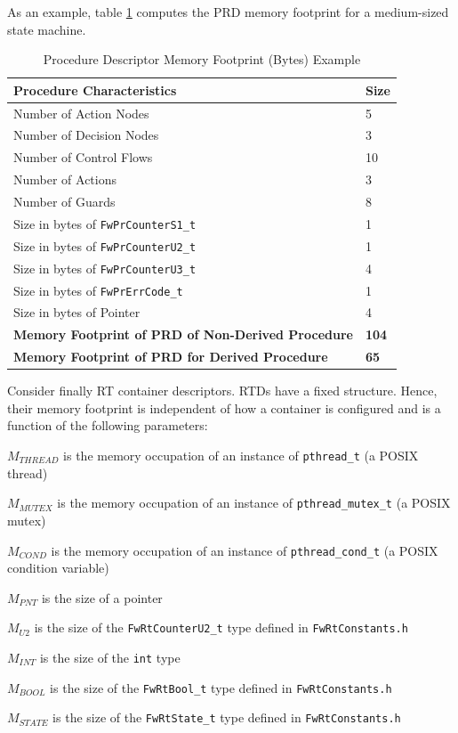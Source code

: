 \documentclass[a4paper,10pt]{article}
\newenvironment{fw_itemize}						%
{\begin{itemize}
  \setlength{\itemsep}{1mm}
  \setlength{\parskip}{0pt}
  \setlength{\parsep}{0pt}}
{\end{itemize}}
\begin{document}
As an example, table \ref{tab:prdMemFootprintExample} computes the PRD memory footprint for a 
medium-sized state machine. 

\begin{longtable}{|l|l|}
\caption{Procedure Descriptor Memory Footprint (Bytes) Example} \label{tab:prdMemFootprintExample}\\
\hline
\rowcolor{gray}
\textbf{Procedure Characteristics} & \textbf{Size} \\
\hline\hline
Number of Action Nodes & 5 \\
\hline
Number of Decision Nodes & 3 \\
\hline
Number of Control Flows & 10 \\
\hline
Number of Actions & 3 \\
\hline
Number of Guards & 8 \\
\hline
Size in bytes of \texttt{FwPrCounterS1\_t} & 1 \\
\hline
Size in bytes of \texttt{FwPrCounterU2\_t} & 1 \\
\hline
Size in bytes of \texttt{FwPrCounterU3\_t} & 4 \\
\hline
Size in bytes of \texttt{FwPrErrCode\_t} & 1 \\
\hline
Size in bytes of Pointer & 4 \\
\hline
\textbf{Memory Footprint of PRD of Non-Derived Procedure} & \textbf{104} \\
\hline
\textbf{Memory Footprint of PRD for Derived Procedure} & \textbf{65} \\
\hline
\end{longtable}


Consider finally RT container descriptors. RTDs have a fixed structure. Hence, their memory footprint is independent of how a container is configured and is a function of the following parameters:

\begin{fw_itemize}
\item {$M_{THREAD}$} is the memory occupation of an instance of \texttt{pthread\_t} (a POSIX thread)
\item {$M_{MUTEX}$} is the memory occupation of an instance of \texttt{pthread\_mutex\_t} (a POSIX mutex)
\item {$M_{COND}$} is the memory occupation of an instance of \texttt{pthread\_cond\_t} (a POSIX condition variable)
\item {$M_{PNT}$} is the size of a pointer 
\item {$M_{U2}$} is the size of the \texttt{FwRtCounterU2\_t} type defined in \texttt{FwRtConstants.h} 
\item {$M_{INT}$} is the size of the \texttt{int} type 
\item {$M_{BOOL}$} is the size of the \texttt{FwRtBool\_t} type defined in \texttt{FwRtConstants.h} 
\item {$M_{STATE}$} is the size of the \texttt{FwRtState\_t} type defined in \texttt{FwRtConstants.h} 
\end{fw_itemize}
\end{document}
